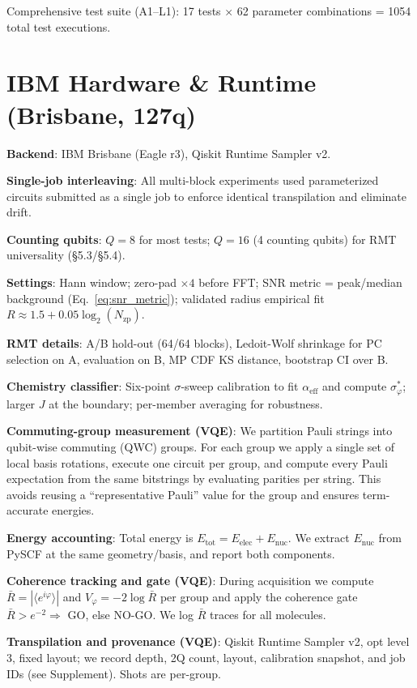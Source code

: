 \documentclass[10pt,twocolumn]{article}
\begin{document}
Comprehensive test suite (A1--L1): 17 tests × 62 parameter combinations = 1054 total test executions.

\section{IBM Hardware \& Runtime (Brisbane, 127q)}

\textbf{Backend}: IBM Brisbane (Eagle r3), Qiskit Runtime Sampler v2.

\textbf{Single-job interleaving}: All multi-block experiments used parameterized circuits submitted as a single job to enforce identical transpilation and eliminate drift.

\textbf{Counting qubits}: $Q = 8$ for most tests; $Q = 16$ (4 counting qubits) for RMT universality (\S5.3/\S5.4).

\textbf{Settings}: Hann window; zero-pad $\times 4$ before FFT; SNR metric = peak/median background (Eq.~\ref{eq:snr_metric}); validated radius empirical fit $R \approx 1.5 + 0.05 \log_2(N_{\text{zp}})$.

\textbf{RMT details}: A/B hold-out (64/64 blocks), Ledoit-Wolf shrinkage for PC selection on A, evaluation on B, MP CDF KS distance, bootstrap CI over B.

\textbf{Chemistry classifier}: Six-point $\sigma$-sweep calibration to fit $\alpha_{\text{eff}}$ and compute $\sigma_\varphi^*$; larger $J$ at the boundary; per-member averaging for robustness.

\textbf{Commuting-group measurement (VQE)}: We partition Pauli strings into qubit-wise commuting (QWC) groups. For each group we apply a single set of local basis rotations, execute one circuit per group, and compute every Pauli expectation from the same bitstrings by evaluating parities per string. This avoids reusing a ``representative Pauli'' value for the group and ensures term-accurate energies.

\textbf{Energy accounting}: Total energy is $E_{\text{tot}} = E_{\text{elec}} + E_{\text{nuc}}$. We extract $E_{\text{nuc}}$ from PySCF at the same geometry/basis, and report both components.

\textbf{Coherence tracking and gate (VQE)}: During acquisition we compute $\bar{R} = |\langle e^{i\varphi} \rangle|$ and $V_\varphi = {-}2 \log \bar{R}$ per group and apply the coherence gate $\bar{R} > e^{-2} \Rightarrow$ GO, else NO-GO. We log $\bar{R}$ traces for all molecules.

\textbf{Transpilation and provenance (VQE)}: Qiskit Runtime Sampler v2, opt level 3, fixed layout; we record depth, 2Q count, layout, calibration snapshot, and job IDs (see Supplement). Shots are per-group.
\end{document}
